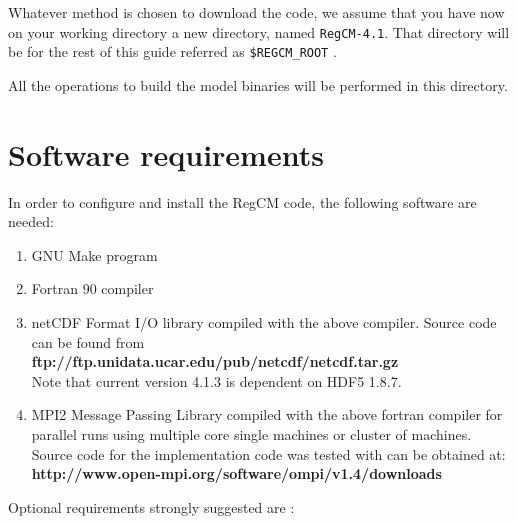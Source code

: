 %
%

Whatever method is chosen to download the code, we assume that you have now
on your working directory a new directory, named \verb=RegCM-4.1=.
That directory will be for the rest of this guide referred as 
\verb=$REGCM_ROOT= .

All the operations to build the model binaries will be performed in this
directory.

\section{Software requirements}

In order to configure and install the RegCM code, the following software are
needed:

\begin{enumerate}
\item GNU Make program
\item Fortran 90 compiler
\item netCDF \cite{Rew_90} Format I/O library compiled with the above compiler.
   Source code can be found from \\
{\bf ftp://ftp.unidata.ucar.edu/pub/netcdf/netcdf.tar.gz} \\
Note that current version 4.1.3 is dependent on HDF5 1.8.7.
\item MPI2 Message Passing Library compiled with the above fortran compiler
for parallel runs using multiple core single machines or cluster of machines.
Source code for the implementation code was tested with can be obtained at: \\
{\bf http://www.open-mpi.org/software/ompi/v1.4/downloads}
\end{enumerate}

Optional requirements strongly suggested are :

